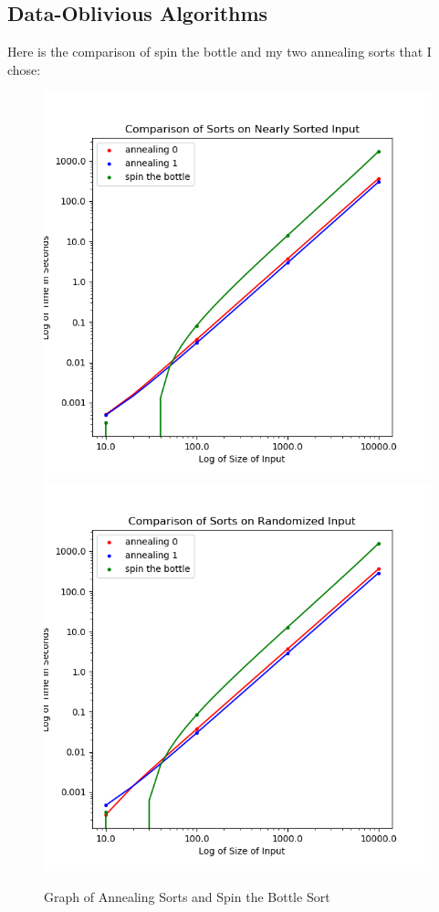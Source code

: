 \documentclass{article}
\begin{document}
\subsection{Data-Oblivious Algorithms}
    Here is the comparison of spin the bottle and my two annealing sorts that I
    chose:
    \begin{figure}[H]
        \centering
        \includegraphics[scale=0.50]{"../images/data-obv-nearly-sorted"}
        \includegraphics[scale=0.50]{"../images/data-obv-randomized"}
        \caption{Graph of Annealing Sorts and Spin the Bottle Sort}
    \end{figure}
\end{document}
